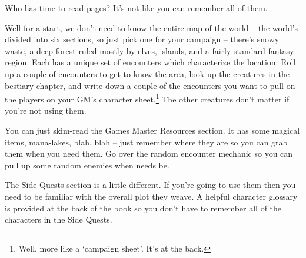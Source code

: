 \begin{multicols}{2}

Who has time to read \pageref{lastpage} pages?  It's not like you can remember all of them.

Well for a start, we don't need to know the entire map of the world -- the world's divided into six sections, so just pick one for your campaign -- there's snowy waste, a deep forest ruled mostly by elves, islands, and a fairly standard fantasy region.
Each has a unique set of encounters which characterize the location.
Roll up a couple of encounters to get to know the area, look up the creatures in the bestiary chapter, and write down a couple of the encounters you want to pull on the players on your GM's character sheet.\footnote{Well, more like a `campaign sheet'.  It's at the back.}
The other creatures don't matter if you're not using them.

You can just skim-read the Games Master Resources section.
It has some magical items, mana-lakes, blah, blah -- just remember where they are so you can grab them when you need them.
Go over the random encounter mechanic so you can pull up some random enemies when needs be.

The Side Quests section is a little different.
If you're going to use them then you need to be familiar with the overall plot they weave.
A helpful character glossary is provided at the back of the book so you don't have to remember all of the characters in the Side Quests.

\end{multicols}

